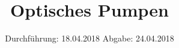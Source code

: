 

\subject{V21}
\title{Optisches Pumpen}
\date{
\centering
  Durchführung: 18.04.2018
  \hspace{3em}
  Abgabe: 24.04.2018
}



\maketitle
\thispagestyle{empty}
\tableofcontents
\newpage

%

%




\printbibliography


